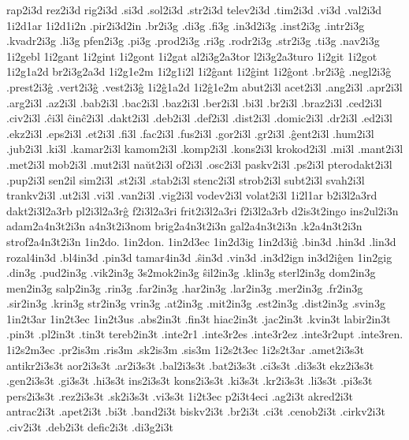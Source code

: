 {rap2i3d rez2i3d rig2i3d .si3d .sol2i3d .str2i3d telev2i3d .tim2i3d
.vi3d .val2i3d
%
1i2d1ar  1i2d1i2n .pir2i3d2in
 
.br2i3g .di3g .fi3g .in3d2i3g .inst2i3g .intr2i3g .kvadr2i3g
.li3g pfen2i3g .pi3g .prod2i3g .ri3g .rodr2i3g .str2i3g .ti3g .nav2i3g
%
1i2gebl
1i2gant 1i2gint 1i2gont
1i2gat al2i3g2a3tor l2i3g2a3turo
1i2git 1i2got
%
1i2g1a2d br2i3g2a3d
1i2g1e2m 1i2g1i2l
  1i2ĝant 1i2ĝint 1i2ĝont
.br2i3ĝ .negl2i3ĝ .prest2i3ĝ .vert2i3ĝ .vest2i3ĝ
1i2ĝ1a2d 1i2ĝ1e2m
abut2i3l acet2i3l .ang2i3l .apr2i3l .arg2i3l .az2i3l .bab2i3l .bac2i3l
.baz2i3l .ber2i3l .bi3l .br2i3l .braz2i3l .ced2i3l .civ2i3l .ĉi3l
ĉinĉ2i3l .dakt2i3l .deb2i3l .def2i3l .dist2i3l .domic2i3l .dr2i3l
.ed2i3l .ekz2i3l .eps2i3l .et2i3l .fi3l .fac2i3l .fus2i3l .gor2i3l
.gr2i3l .ĝent2i3l .hum2i3l .jub2i3l .ki3l .kamar2i3l kamom2i3l
.komp2i3l .kons2i3l krokod2i3l .mi3l .mant2i3l .met2i3l mob2i3l
.mut2i3l naŭt2i3l of2i3l .osc2i3l paskv2i3l .ps2i3l pterodakt2i3l
.pup2i3l sen2il sim2i3l .st2i3l .stab2i3l stenc2i3l strob2i3l subt2i3l
svah2i3l trankv2i3l .ut2i3l .vi3l .van2i3l .vig2i3l vodev2i3l volat2i3l
1i2l1ar
b2i3l2a3rd dakt2i3l2a3rb pl2i3l2a3rĝ f2i3l2a3ri frit2i3l2a3ri f2i3l2a3rb
d2is3t2ingo
ins2ul2i3n
adam2a4n3t2i3n a4n3t2i3nom brig2a4n3t2i3n gal2a4n3t2i3n .k2a4n3t2i3n
strof2a4n3t2i3n
  1in2do. 1in2don. 1in2d3ec 1in2d3ig 1in2d3iĝ
.bin3d .hin3d .lin3d rozal4in3d .bl4in3d .pin3d tamar4in3d .ŝin3d .vin3d
.in3d2ign in3d2iĝen
 1in2gig
.din3g .pud2in3g .vik2in3g 3s2mok2in3g ŝil2in3g .klin3g sterl2in3g
dom2in3g men2in3g salp2in3g .rin3g .far2in3g .har2in3g
.lar2in3g .mer2in3g .fr2in3g .sir2in3g .krin3g str2in3g vrin3g
.at2in3g .mit2in3g .est2in3g .dist2in3g .svin3g
 1in2t3ar 1in2t3ec 1in2t3us
.abs2in3t .fin3t hiac2in3t .jac2in3t .kvin3t labir2in3t .pin3t .pl2in3t
.tin3t tereb2in3t
.inte2r1
.inte3r2es .inte3r2ez .inte3r2upt
  .inte3ren.
 1i2s2m3ec
.pr2is3m .ris3m .sk2is3m .sis3m
 1i2s2t3ec 1i2s2t3ar
%
.amet2i3s3t antikr2i3s3t aor2i3s3t .ar2i3s3t .bal2i3s3t .bat2i3s3t .ci3s3t
.di3s3t ekz2i3s3t .gen2i3s3t .gi3s3t .hi3s3t ins2i3s3t kons2i3s3t .ki3s3t
.kr2i3s3t .li3s3t .pi3s3t pers2i3s3t .rez2i3s3t .sk2i3s3t .vi3s3t
 1i2t3ec p2i3t4eci
%
.ag2i3t akred2i3t antrac2i3t .apet2i3t .bi3t .band2i3t biskv2i3t
.br2i3t .ci3t .cenob2i3t .cirkv2i3t .civ2i3t .deb2i3t defic2i3t .di3g2i3t
}

